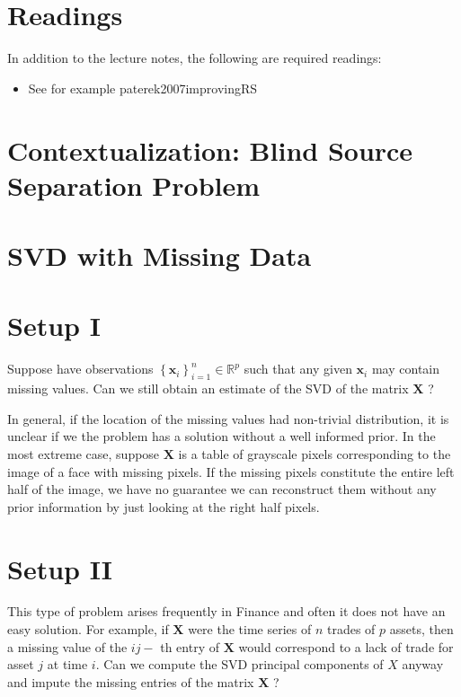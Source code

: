 \documentclass[11pt]{article}
\theoremstyle{plain} %
\theoremstyle{remark}
\begin{document}
\begin{center}

  {}
\end{center}
\vspace{2em}

\tableofcontents

\section*{Readings}
In addition to the lecture notes, the following are required readings:

\begin{itemize}
  \item See for example paterek2007improvingRS
\end{itemize}

\section{Contextualization: Blind Source Separation Problem}

\section*{SVD with Missing Data}
\section*{Setup I}
Suppose have observations $\left\{\mathbf{x}_{i}\right\}_{i=1}^{n} \in \mathbb{R}^{p}$ such that any given $\mathbf{x}_{i}$ may contain missing values. Can we still obtain an estimate of the SVD of the matrix $\mathbf{X}$ ?

In general, if the location of the missing values had non-trivial distribution, it is unclear if we the problem has a solution without a well informed prior. In the most extreme case, suppose $\mathbf{X}$ is a table of grayscale pixels corresponding to the image of a face with missing pixels. If the missing pixels constitute the entire left half of the image, we have no guarantee we can reconstruct them without any prior information by just looking at the right half pixels.

\section*{Setup II}
This type of problem arises frequently in Finance and often it does not have an easy solution. For example, if $\mathbf{X}$ were the time series of $n$ trades of $p$ assets, then a missing value of the $i j-$ th entry of $\mathbf{X}$ would correspond to a lack of trade for asset $j$ at time $i$. Can we compute the SVD principal components of $X$ anyway and impute the missing entries of the matrix $\mathbf{X}$ ?
\end{document}
